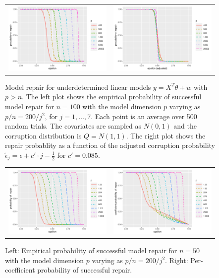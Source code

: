 \begin{figure}[ht]
  \begin{center}
    \begin{tabular}{cc}
      \includegraphics[width=.47\textwidth]{figures/fig3a} &
      \includegraphics[width=.47\textwidth]{figures/fig3b}\\[-10pt]
    \end{tabular}
    \caption{Model repair for underdetermined linear models $y=X^T\theta + w$ with $p>n$. The left plot shows the empirical probability of successful model repair for $n=100$ with the model dimension $p$
    varying as $p/n = 200 /j^2$, for $j=1,\ldots, 7$. Each point is an average over 500 random trials. The covariates are sampled as $N(0,1)$ and the corruption distribution is $Q=N(1,1)$. The right plot shows the repair probablity as a function
    of the adjusted corruption probability $\tilde\epsilon_j = \epsilon + c'\cdot j - \frac{1}{2}$ for $c'=0.085$.}
    \label{fig:exp1}
    \vskip10pt
    \begin{tabular}{cc}
      \includegraphics[width=.47\textwidth]{figures/fig4b} &
      \includegraphics[width=.47\textwidth]{figures/fig4a}\\[-10pt]
    \end{tabular}
  \end{center}
\caption{Left: Empirical probability of successful model repair for $n=50$ with the model dimension $p$
varying as $p/n = 200 /j^2$. Right: Per-coefficient probability of successful repair.}
\label{fig:exp1b}
\end{figure}


